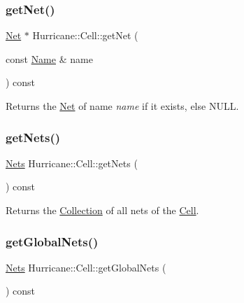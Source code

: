 \subsubsection{\texorpdfstring{get\+Net()}{getNet()}}
{\footnotesize\ttfamily \mbox{\hyperlink{classHurricane_1_1Net}{Net}} $\ast$ Hurricane\+::\+Cell\+::get\+Net (\begin{DoxyParamCaption}\item[{const \mbox{\hyperlink{classHurricane_1_1Name}{Name}} \&}]{name }\end{DoxyParamCaption}) const}

Returns the \mbox{\hyperlink{classHurricane_1_1Net}{Net}} of name {\itshape name} if it exists, else {\ttfamily N\+U\+LL}. \mbox{\label{classHurricane_1_1Cell_a8b4728abe83e9ec21d7bee1154218279}} 
\subsubsection{\texorpdfstring{get\+Nets()}{getNets()}}
{\footnotesize\ttfamily \mbox{\hyperlink{namespaceHurricane_a3404a8b17130a1824f4a281704b04df7}{Nets}} Hurricane\+::\+Cell\+::get\+Nets (\begin{DoxyParamCaption}{ }\end{DoxyParamCaption}) const\hspace{0.3cm}{\ttfamily [inline]}}

Returns the \mbox{\hyperlink{classHurricane_1_1Collection}{Collection}} of all nets of the \mbox{\hyperlink{classHurricane_1_1Cell}{Cell}}. \mbox{\label{classHurricane_1_1Cell_a1512722d821edc18ff38e673862cd108}} 
\subsubsection{\texorpdfstring{get\+Global\+Nets()}{getGlobalNets()}}
{\footnotesize\ttfamily \mbox{\hyperlink{namespaceHurricane_a3404a8b17130a1824f4a281704b04df7}{Nets}} Hurricane\+::\+Cell\+::get\+Global\+Nets (\begin{DoxyParamCaption}{ }\end{DoxyParamCaption}) const}

